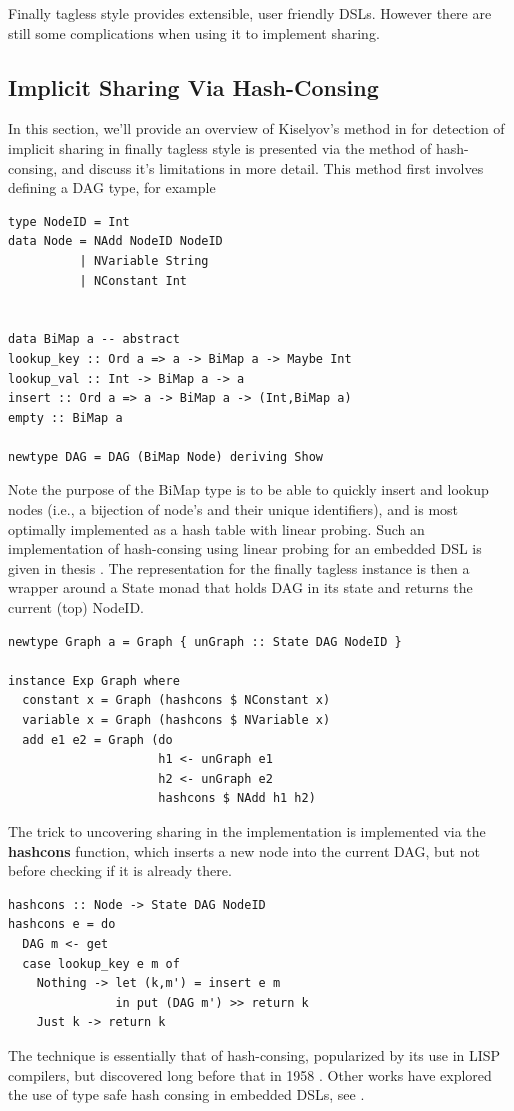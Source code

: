 \documentclass[runningheads]{llncs}
\begin{document}
Finally tagless style provides extensible, user friendly DSLs. However there
are still some complications when using it to implement sharing.

\subsection{Implicit Sharing Via Hash-Consing}

In this section, we'll provide an overview of Kiselyov's method in
\cite{kiselyov:sharing} for detection of implicit sharing in finally tagless
style is presented via the method of hash-consing, and discuss it's limitations
in more detail. This method first involves defining a DAG type, for example
\begin{verbatim}
type NodeID = Int
data Node = NAdd NodeID NodeID
          | NVariable String
          | NConstant Int


data BiMap a -- abstract
lookup_key :: Ord a => a -> BiMap a -> Maybe Int
lookup_val :: Int -> BiMap a -> a
insert :: Ord a => a -> BiMap a -> (Int,BiMap a)
empty :: BiMap a

newtype DAG = DAG (BiMap Node) deriving Show
\end{verbatim}

Note the purpose of the BiMap type is to be able to quickly insert and lookup
nodes (i.e., a bijection of node's and their unique identifiers), and is most
optimally implemented as a hash table with linear probing. Such an
implementation of hash-consing using linear probing for an embedded DSL is given
in thesis \cite{thai2021type}. The representation for the finally tagless
instance is then a wrapper around a State monad that holds DAG in its state and
returns the current (top) NodeID.

\begin{verbatim}
newtype Graph a = Graph { unGraph :: State DAG NodeID }

instance Exp Graph where
  constant x = Graph (hashcons $ NConstant x)
  variable x = Graph (hashcons $ NVariable x)
  add e1 e2 = Graph (do
                     h1 <- unGraph e1
                     h2 <- unGraph e2
                     hashcons $ NAdd h1 h2)
\end{verbatim}

The trick to uncovering sharing in the implementation is implemented via the
{\bf hashcons} function, which inserts a new node into the current DAG, but not
before checking if it is already there.
\begin{verbatim}
hashcons :: Node -> State DAG NodeID
hashcons e = do
  DAG m <- get
  case lookup_key e m of
    Nothing -> let (k,m') = insert e m
               in put (DAG m') >> return k
    Just k -> return k
\end{verbatim}
The technique is essentially that of
hash-consing, popularized by its use in LISP compilers, but discovered long
before that in 1958 \cite{ershov1958:consing}. Other works have explored the use
of type safe hash consing in embedded DSLs, see \cite{filliatre:typesafeconsing}.
\end{document}
